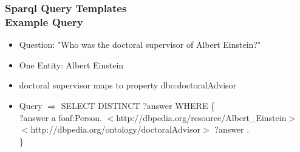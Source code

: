\documentclass{beamer}
\newcommand\tab[1][1cm]{\hspace*{#1}}
\begin{document}
\begin{frame}
\frametitle{Sparql Query Templates \\ {\normalsize Example Query}}
\begin{example}
	\begin{itemize}
		\item Question: "Who was the doctoral supervisor of Albert Einstein?"
		\item One Entity: Albert Einstein
		\item doctoral supervisor maps to property dbo:doctoralAdvisor  
		\item[] Query $\Rightarrow$ SELECT DISTINCT ?answer WHERE \{  \\
		\tab[1.4cm]	?answer a foaf:Person. 
		\tab[1.4cm] $<$http://dbpedia.org/resource/Albert\_Einstein$>$ 
		\tab[1.4cm] $<$http://dbpedia.org/ontology/doctoralAdvisor$>$ ?answer . \\
		\tab[1.4cm] \}
	\end{itemize}
\end{example}
\end{frame}
\end{document}
